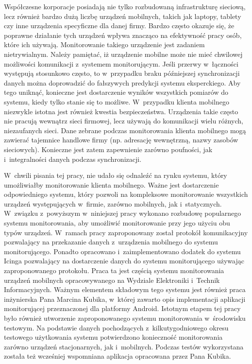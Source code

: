 Współczesne korporacje posiadają nie tylko rozbudowaną infrastrukturę
sieciową, lecz również bardzo dużą liczbę urządzeń mobilnych, takich
jak laptopy, tablety czy inne urządzenia specyficzne dla danej
firmy. Bardzo często okazuje się, że poprawne działanie tych urządzeń
wpływa znacząco na efektywność pracy osób, które ich
używają. Monitorowanie takiego urządzenie jest zadaniem
nietrywialnym. Należy pamiętać, iż urządzenie mobilne może nie mieć
chwilowej możliwości komunikacji z~systemem monitorującym. Jeśli
przerwy w~łączności występują stosunkowo często, to w~przypadku braku
późniejszej synchronizacji danych można doprowadzić do fałszywych
predykcji systemu eksperckiego. Aby tego uniknąć, konieczne jest
dostarczenie wyników wszystkich pomiarów do systemu, kiedy tylko
stanie się to możliwe. W~przypadku klienta mobilnego niezwykle istotna
jest również kwestia bezpieczeństwa. Urządzenia takie często nie
pracują wewnątrz sieci firmowej, lecz używają do komunikacji wielu
różnych, niezaufanych sieci. Dane zebrane podczas monitorowania
klienta mobilnego mogą zawierać tajemnice handlowe firmy
(np. adresację wewnętrzną, nazwy zasobów sieciowych). Konieczne jest
zatem zapewnienie zarówno poufności, jak i~integralności danych podczas
synchronizacji.

W~chwili pisania tej pracy, nie udało się odnaleźć na rynku systemu,
który umożliwiałby monitorowanie klienta mobilnego. Ważne jest
dostarczenie odpowiedniego systemu, który pozwoli na kompleksowe
monitorowanie wszystkich urządzeń występujących w~firmie, zarówno
mobilnych, jak i~statycznych. W~związku z~powyższym w~niniejszej pracy
wykonano rozbudowę popularnego systemu monitorowania, aby umożliwić
monitorowanie przy jego użyciu obu typów urządzeń. W~ramach pracy
zaproponowany został protokół komunikacyjny pozwalający na przekazanie
danych z~urządzenia mobilnego do systemu monitorującego. Ponadto
opracowano i~zaimplementowano dodatek do systemu Icinga pozwalający na
dostarczenie danych do systemu monitorującego używając zaproponowanego
protokołu. Praca ta jest częścią systemu monitorowania urządzeń
mobilnych opracowywanego na Wydziale Elektroniki i~Technik
Informacyjnych. Ważnym elementem składowym tego systemu jest również
praca inżynierska Pana Marcina Kubika\cite{book:pracaKubika}, w~której
zawarto opis implementacji aplikacji monitorującej przeznaczonej dla
platformy Android. Istotnym etapem tej pracy było również utworzenie
zaproponowanego systemu monitorowania w~środowisku testowym. Na
podstawie danych pochodzących z~kilkutygodniowego okresu testowego
użytkowania systemu potwierdzono konieczność monitorowania zarówno
urządzeń stacjonarnych, jak i~mobilnych. Podczas testów wykorzystana
została też wcześniej wspomniana aplikacja opracowana przez Pana Kubika.

